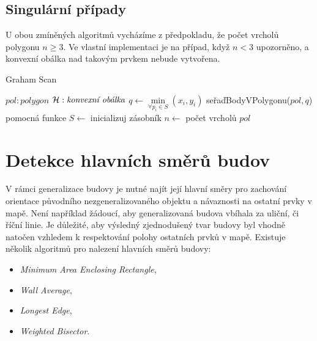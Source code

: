 \bigbreak

\subsection*{Singulární případy}

\par U obou zmíněných algoritmů vycházíme z předpokladu, že počet vrcholů polygonu $n \geq 3$. Ve vlastní implementaci je na případ, když $n < 3$ upozorněno, a konvexní obálka nad takovým prvkem nebude vytvořena.

\bigbreak

\begin{algorithm}[h]
\caption{Graham Scan}\label{alg:cap}
\begin{algorithmic}
\Require $pol: polygon$
\Ensure $\mathcal{H}: {\text{\emph{konvexní obálka}}}$
\State $q \gets {\text{$\underset{\forall p_i \in S}{\min}(x_i, y_i)$}}$
\State seřaďBodyVPolygonu($pol, q$) \Comment pomocná funkce
\State $S \gets$ inicializuj zásobník
\State $n \gets$ počet vrcholů $pol $
\State
       
      \Else {}
       
      \EndIf
    \EndWhile
  \EndFor
{}

\end{algorithmic}
\end{algorithm}

\bigbreak

\section*{Detekce hlavních směrů budov}

\par V rámci generalizace budovy je nutné najít její hlavní směry pro zachování orientace původního nezgeneralizovaného objektu a návaznosti na ostatní prvky v mapě. Není například žádoucí, aby generalizovaná budova vbíhala za uliční, či říční linie. Je důležité, aby výsledný zjednodušený tvar budovy byl vhodně natočen vzhledem k respektování polohy ostatních prvků v mapě. Existuje několik algoritmů pro nalezení hlavních směrů budovy:

\begin{itemize}
    
    \item \emph{Minimum Area Enclosing Rectangle},
    \item \emph{Wall Average},
    \item \emph{Longest Edge},
    \item \emph{Weighted Bisector}.
\end{itemize}

